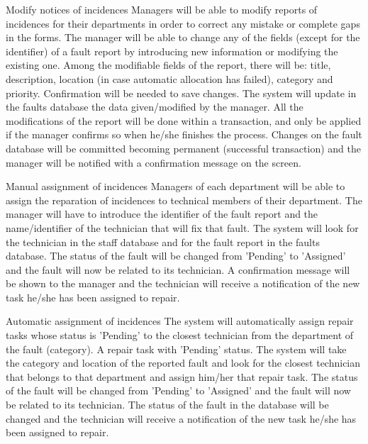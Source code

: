 \begin{requirement}{Modify notices of incidences}
\reqdesc Managers will be able to modify reports of incidences for their departments in order to correct any mistake or complete gaps in the forms.
\reqin The manager will be able to change any of the fields (except for the identifier) of a fault report by introducing new information or modifying the existing one. Among the modifiable fields of the report, there will be: title, description, location (in case automatic allocation has failed), category and priority. Confirmation will be needed to save changes.
\reqsteps The system will update in the faults database the data given/modified by the manager. All the modifications of the report will be done within a transaction, and only be applied if the manager confirms so when he/she finishes the process.
\reqout Changes on the fault database will be committed becoming permanent (successful transaction) and the manager will be notified with a confirmation message on the screen.
\end{requirement}

\begin{requirement}{Manual assignment of incidences}
\reqdesc Managers of each department will be able to assign the reparation of incidences to technical members of their department.
\reqin The manager will have to introduce the identifier of the fault report and the name/identifier of the technician that will fix that fault.
\reqsteps The system will look for the technician in the staff database and for the fault report in the faults database. The status of the fault will be changed from 'Pending' to 'Assigned' and the fault will now be related to its technician.
\reqout A confirmation message will be shown to the manager and the technician will receive a notification of the new task he/she has been assigned to repair.
\end{requirement}

\begin{requirement}{Automatic assignment of incidences}
\reqdesc The system will automatically assign repair tasks whose status is 'Pending' to the closest technician from the department of the fault (category).
\reqin A repair task with 'Pending' status.
\reqsteps The system will take the category and location of the reported fault and look for the closest technician that belongs to that department and assign him/her that repair task. The status of the fault will be changed from 'Pending' to 'Assigned' and the fault will now be related to its technician.
\reqout The status of the fault in the database will be changed and the technician will receive a notification of the new task he/she has been assigned to repair.
\end{requirement}

